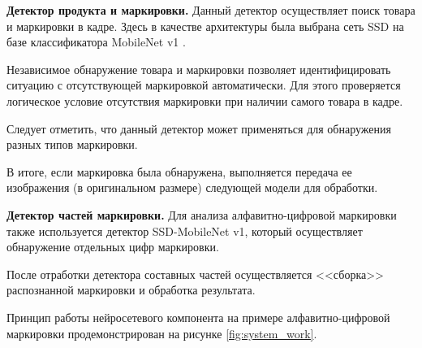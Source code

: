 \textbf{Детектор продукта и маркировки.} Данный детектор осуществляет поиск товара и маркировки в кадре. Здесь в качестве архитектуры была выбрана сеть SSD \cite{liu} на базе классификатора MobileNet v1 \cite{howard}.

Независимое обнаружение товара и маркировки позволяет идентифицировать ситуацию с отсутствующей маркировкой автоматически. Для этого проверяется логическое условие отсутствия маркировки при наличии самого товара в кадре.

Следует отметить, что данный детектор может применяться для обнаружения разных типов маркировки.

В итоге, если маркировка была обнаружена, выполняется передача ее изображения (в оригинальном размере) следующей модели для обработки.


\textbf{Детектор частей маркировки.} Для анализа алфавитно-цифровой маркировки также используется детектор SSD-MobileNet v1, который осуществляет обнаружение отдельных цифр маркировки.

После отработки детектора составных частей осуществляется <<сборка>> распознанной маркировки и обработка результата.

Принцип работы нейросетевого компонента на примере алфавитно-цифровой маркировки продемонстрирован на рисунке \ref{fig:system_work}.

